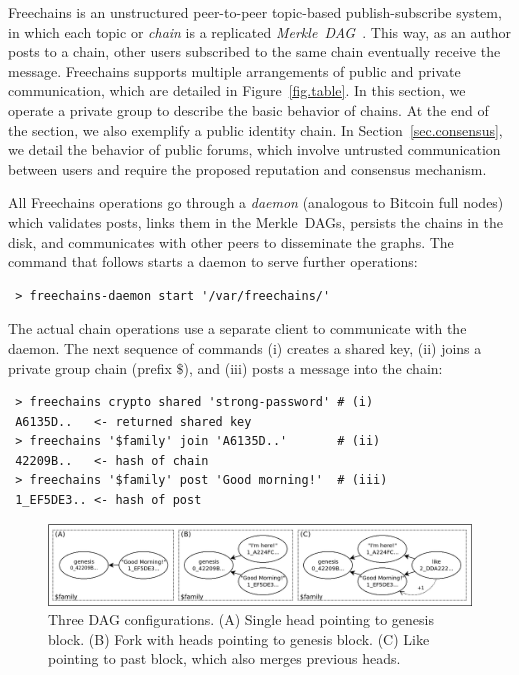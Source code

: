 \documentclass[10pt,journal,compsoc]{IEEEtran}
\newcommand{\FC}       {Freechains\xspace}
\begin{document}
\FC is an unstructured peer-to-peer topic-based publish-subscribe system, in
which each topic or \emph{chain} is a replicated
\emph{Merkle~DAG}~\cite{fcs.sbseg20}.
This way, as an author posts to a chain, other users subscribed to the same
chain eventually receive the message.
\FC supports multiple arrangements of public and private communication, which
are detailed in Figure~\ref{fig.table}.
In this section, we operate a private group to describe the basic behavior of
chains.
At the end of the section, we also exemplify a public identity chain.
In Section~\ref{sec.consensus}, we detail the behavior of public forums, which
involve untrusted communication between users and require the proposed
reputation and consensus mechanism.

All \FC operations go through a \emph{daemon} (analogous to Bitcoin full nodes)
which validates posts, links them in the Merkle~DAGs, persists the chains in
the disk, and communicates with other peers to disseminate the graphs.
The command that follows starts a daemon to serve further operations:

{\footnotesize
\begin{verbatim}
 > freechains-daemon start '/var/freechains/'
\end{verbatim}
}

The actual chain operations use a separate client to communicate with the
daemon.
The next sequence of commands (i) creates a shared key, (ii) joins a private
group chain (prefix $\$$), and (iii) posts a message into the chain:

{\footnotesize
\begin{verbatim}
 > freechains crypto shared 'strong-password' # (i)
 A6135D..   <- returned shared key
 > freechains '$family' join 'A6135D..'       # (ii)
 42209B..   <- hash of chain
 > freechains '$family' post 'Good morning!'  # (iii)
 1_EF5DE3.. <- hash of post
\end{verbatim}
}

\begin{figure}
\centering
\includegraphics[width=\textwidth]{family.png}
\caption{
    Three DAG configurations.
    (A) Single head pointing to genesis block.
    (B) Fork with heads pointing to genesis block.
    (C) Like pointing to past block, which also merges previous heads.
}
\label{fig.family}
\end{figure}
\end{document}
